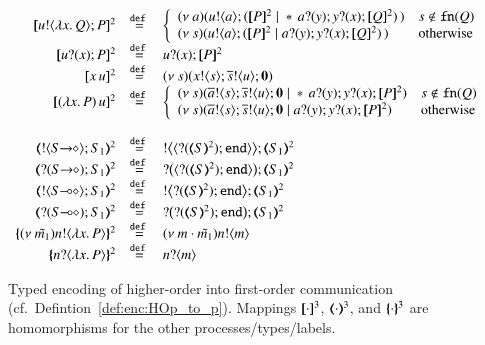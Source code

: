 \begin{figure}[t]
	\[
	\begin{array}{rcl}
		\pmap{\bout{u}{\abs{x}{Q}} P}{2} & \defeq &  \left\{
		\begin{array}{ll}
			\newsp{a}{\bout{u}{a} (\pmap{P}{2} \Par \repl{} \binp{a}{y} \binp{y}{x} \pmap{Q}{2})\,} & s \notin \fn{Q} \\
			\newsp{s}{\bout{u}{a} (\pmap{P}{2} \Par \binp{a}{y} \binp{y}{x} \pmap{Q}{2})\,} & \textrm{otherwise} %
		\end{array}
		\right.
		\\
		\pmap{\binp{u}{x} P}{2} &\defeq&  \binp{u}{x} \pmap{P}{2}
		\\
		\pmap{\appl{x}{u}}{2} & \defeq & \newsp{s}{\bout{x}{s} \bout{\dual{s}}{u} \inact}
		\\
		\pmap{\appl{(\abs{x} P)}{u}}{2} & \defeq & 
		\left\{
		\begin{array}{ll}
			\newsp{s}{\bout{\dual{a}}{s} \bout{\dual{s}}{u} \inact \Par \repl{} \binp{a}{y} \binp{y}{x} \pmap{P}{2}} & s \notin \fn{Q} \\
			\newsp{s}{\bout{\dual{a}}{s} \bout{\dual{s}}{u} \inact \Par \binp{a}{y} \binp{y}{x} \pmap{P}{2}} & \textrm{otherwise}
		\end{array}
		\right.

		\\
		\\
		\tmap{\btout{\shot{S}}S_1}{2} & \defeq & \bbtout{\chtype{\btinp{\tmap{S}{2}}\tinact}}\tmap{S_1}{2} \\
		\tmap{\btinp{\shot{S}}S_1}{2} & \defeq & \bbtinp{\chtype{\btinp{\tmap{S}{2}}\tinact}}\tmap{S_1}{2} \\

		\tmap{\btout{\lhot{S}}S_1}{2} & \defeq & \bbtout{\btinp{\tmap{S}{2}}\tinact}\tmap{S_1}{2} \\
		\tmap{\btinp{\lhot{S}}S_1}{2} & \defeq & \bbtinp{\btinp{\tmap{S}{2}}\tinact}\tmap{S_1}{2} \\
		\mapa{\news{\tilde{m_1}}\bactout{n}{\abs{ x}{P}} }^{2} &  \defeq & \news{m \cdot \tilde{m_1}} \bactout{n}{m} \\
		\mapa{\bactinp{n}{\abs{ x}{P}} }^{2} &  \defeq & \bactinp{n}{m}
	\end{array}
	\]
	\caption{
		Typed encoding of higher-order  into first-order communication (cf.~Defintion~\ref{def:enc:HOp_to_p}).
		\label{fig:enc:HOp_to_p}
		Mappings 
		$[\!\![\cdot]\!\!]^3$,
		$(\!\!\langle\cdot\rangle\!\!)^3$, 
		and 
		$\{\!\!\{\cdot\}\!\!\}^3$
		are homomorphisms for the other processes/types/labels. 
	}
\end{figure}
